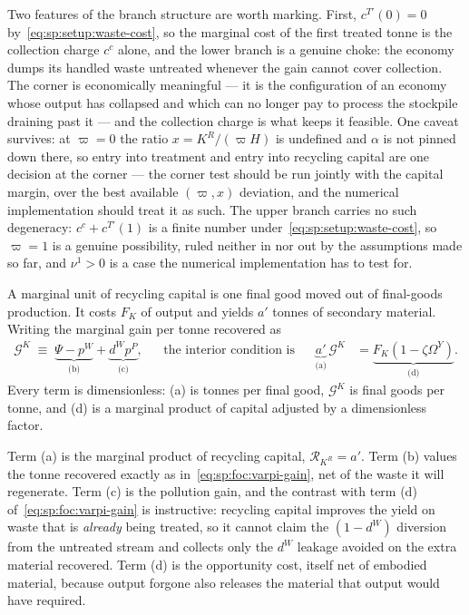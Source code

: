 Two features of the branch structure are worth marking. First,
$c^{T\prime}\left(0\right)=0$ by~\eqref{eq:sp:setup:waste-cost}, so the marginal cost of the first
treated tonne is the collection charge $c^c$ alone, and the lower branch is a genuine choke: the
economy dumps its handled waste untreated whenever the gain cannot cover collection. The corner is
economically meaningful --- it is the configuration of an economy whose output has collapsed and
which can no longer pay to process the stockpile draining past it --- and the collection charge is
what keeps it feasible. One caveat survives: at $\varpi=0$ the ratio $x=K^R/\left(\varpi H\right)$ is
undefined and $\alpha$ is not pinned down there, so entry into treatment and entry into recycling
capital are one decision at the corner --- the corner test should be run jointly with the capital
margin, over the best available $\left(\varpi,x\right)$ deviation, and the numerical implementation
should treat it as such.
The upper branch carries no such degeneracy: $c^c+c^{T\prime}\left(1\right)$ is a finite number
under~\eqref{eq:sp:setup:waste-cost}, so $\varpi=1$ is a genuine possibility, ruled neither in nor out
by the assumptions made so far, and $\nu^1>0$ is a case the numerical implementation has to test for.

 A marginal unit of recycling capital is one final good moved out of final-goods production. It costs $F_K$ of output and yields $a'$ tonnes of secondary material. Writing the marginal gain per tonne recovered as
\begin{align}
\mathcal G^K \;\equiv\; \underbrace{\Psi-p^W}_{\text{(b)}}+\underbrace{d^Wp^P}_{\text{(c)}},
&&\text{the interior condition is}
&&
\underbrace{a'}_{\text{(a)}}\,\mathcal G^K &= \underbrace{F_K\left(1-\zeta\Omega^Y\right)}_{\text{(d)}} .
\label{eq:sp:foc:KR}
\end{align}
Every term is dimensionless: (a) is tonnes per final good, $\mathcal G^K$ is final goods per tonne, and (d) is a marginal product of capital adjusted by a dimensionless factor.

Term (a) is the marginal product of recycling capital, $\mathcal R_{K^R}=a'$. Term (b) values the tonne recovered exactly as in~\eqref{eq:sp:foc:varpi-gain}, net of the waste it will regenerate. Term (c) is the pollution gain, and the contrast with term (d) of~\eqref{eq:sp:foc:varpi-gain} is instructive: recycling capital improves the yield on waste that is \emph{already} being treated, so it cannot claim the $\left(1-d^W\right)$ diversion from the untreated stream and collects only the $d^W$ leakage avoided on the extra material recovered. Term (d) is the opportunity cost, itself net of embodied material, because output forgone also releases the material that output would have required.

